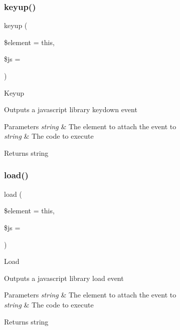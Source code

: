 \subsubsection{\texorpdfstring{keyup()}{keyup()}}
{\footnotesize\ttfamily keyup (\begin{DoxyParamCaption}\item[{}]{\$element = {\ttfamily \textquotesingle{}this\textquotesingle{}},  }\item[{}]{\$js = {\ttfamily \textquotesingle{}\textquotesingle{}} }\end{DoxyParamCaption})}

Keyup

Outputs a javascript library keydown event


\begin{DoxyParams}{Parameters}
{\em string} & The element to attach the event to \\
\hline
{\em string} & The code to execute \\
\hline
\end{DoxyParams}
\begin{DoxyReturn}{Returns}
string 
\end{DoxyReturn}
\mbox{\label{class_c_i___javascript_a5e0d3ce786a91561730aa9610b811f67}} 
\subsubsection{\texorpdfstring{load()}{load()}}
{\footnotesize\ttfamily load (\begin{DoxyParamCaption}\item[{}]{\$element = {\ttfamily \textquotesingle{}this\textquotesingle{}},  }\item[{}]{\$js = {\ttfamily \textquotesingle{}\textquotesingle{}} }\end{DoxyParamCaption})}

Load

Outputs a javascript library load event


\begin{DoxyParams}{Parameters}
{\em string} & The element to attach the event to \\
\hline
{\em string} & The code to execute \\
\hline
\end{DoxyParams}
\begin{DoxyReturn}{Returns}
string 
\end{DoxyReturn}
\mbox{\label{class_c_i___javascript_afa625106ad51c2f80ccfadf94981041d}} 

